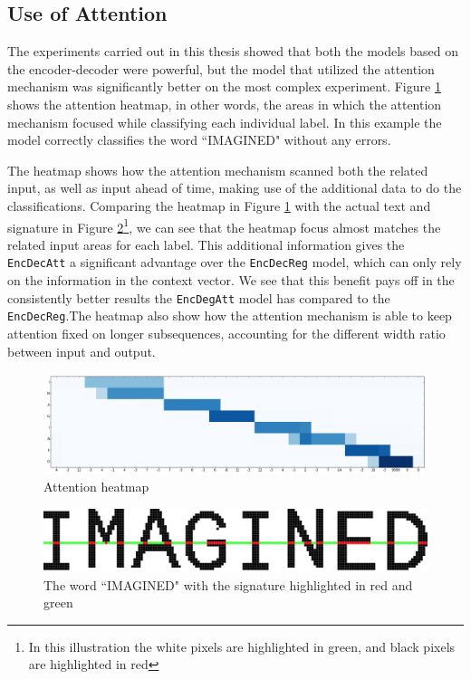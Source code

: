 \subsection{Use of Attention}
The experiments carried out in this thesis showed that both the models based on the encoder-decoder were powerful, but the model that utilized the attention mechanism was significantly better on the most complex experiment. Figure \ref{fig:attention_heatmap} shows the attention heatmap, in other words, the areas in which the attention mechanism focused while classifying each individual label. In this example the model correctly classifies the word ``IMAGINED" without any errors. 

The heatmap shows how the attention mechanism scanned both the related input, as well as input ahead of time, making use of the additional data to do the classifications. Comparing the heatmap in Figure \ref{fig:attention_heatmap} with the actual text and signature in Figure  \ref{fig:imagine_highlighted}\footnote{In this illustration the white pixels are highlighted in green, and black pixels are highlighted in red}, we can see that the heatmap focus almost matches the related input areas for each label. This additional information gives the {\tt EncDecAtt} a significant advantage over the {\tt EncDecReg} model, which can only rely on the information in the context vector. We see that this benefit pays off in the consistently better results the {\tt EncDegAtt} model has compared to the {\tt EncDecReg}.The heatmap also show how the attention mechanism is able to keep attention fixed on longer subsequences, accounting for the different width ratio between input and output.

\begin{figure}[ht]
    \centering
    \includegraphics[width=1\textwidth]{fig/conclusion/attention_crop.png}
    \caption{Attention heatmap}
    \label{fig:attention_heatmap}
\end{figure}

\begin{figure}[ht]
    \centering
    \includegraphics[width=1\textwidth]{fig/conclusion/imagined_grid_exported.png}
    \caption{The word ``IMAGINED" with the signature highlighted in red and green}
    \label{fig:imagine_highlighted}
\end{figure}
